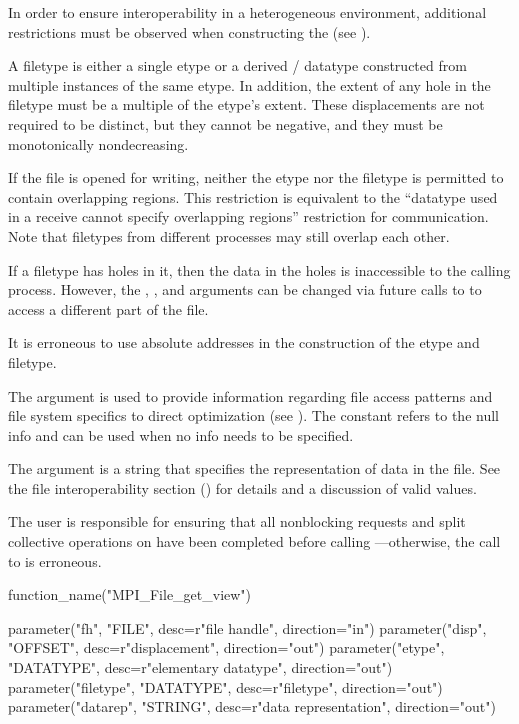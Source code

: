 \begin{users}
In order to ensure interoperability in a heterogeneous environment,
additional restrictions must be observed when constructing the
(see ).
\end{users}

A filetype is either a single etype or a derived \MPI/ datatype
constructed from multiple instances of the same etype.
In addition,
the extent of any hole in the filetype
must be a multiple of the etype's extent.
These displacements are not required to be distinct,
but they cannot be negative,
and they must be monotonically nondecreasing.

If the file is opened for writing,
neither the etype nor the filetype is permitted
to contain overlapping regions.
This restriction is equivalent to the ``datatype used in a receive
cannot specify overlapping regions'' restriction for communication.
Note that filetypes from different processes may still
overlap each other.

If a filetype has holes in it,
then the data in the holes is inaccessible to the calling process.
However, the , , and 
arguments can be changed via future calls to 
to access a different part of the file.

It is erroneous to use absolute addresses in the construction
of the etype and filetype.

The  argument is used to provide information
regarding file access patterns and file system specifics
to direct optimization
(see ).
The constant  refers to the null info
and can be used when no info needs to be specified.

The  argument is a string that specifies
the representation of data in the file.
See the file interoperability section
()
for details and a discussion of valid values.

The user is responsible for ensuring that all nonblocking requests
and split collective operations
on  have been completed before calling
---otherwise, the call to
 is erroneous.

%
%
\begin{mpi-binding}
    function_name("MPI_File_get_view")
    
    parameter("fh", "FILE", desc=r"file handle", direction="in")
    parameter("disp", "OFFSET", desc=r"displacement", direction="out")
    parameter("etype", "DATATYPE", desc=r"elementary datatype", direction="out")
    parameter("filetype", "DATATYPE", desc=r"filetype", direction="out")
    parameter("datarep", "STRING", desc=r"data representation", direction="out")
\end{mpi-binding}

